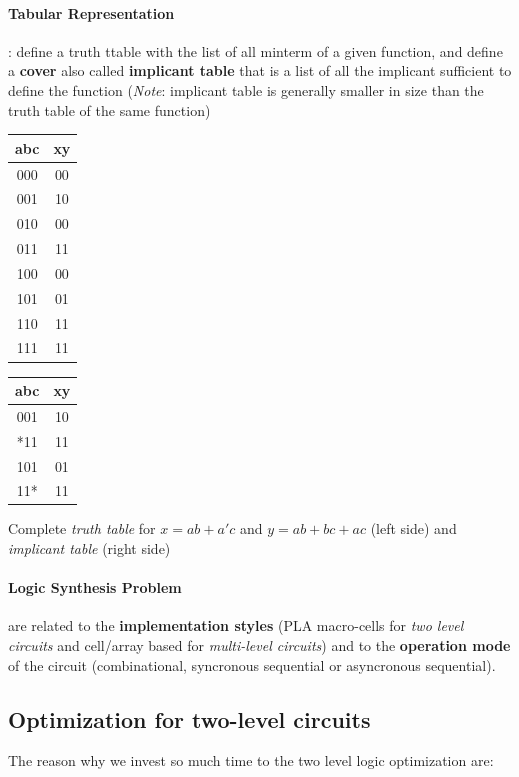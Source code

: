 \paragraph{Tabular Representation}: define a truth ttable with the list of all minterm of a given function, and define a \textbf{cover} also called \textbf{implicant table} that is a list of all the implicant sufficient to define the function (\textit{Note}: implicant table is generally smaller in size than the truth table of the same function)

\begin{center}
	
	\begin{tabular}{|c|c|}
		\hline
		abc & xy \\ \hline
		000 & 00 \\ \hline
		001 & 10 \\ \hline
		010 & 00 \\ \hline
		011 & 11 \\ \hline
		100 & 00 \\ \hline
		101 & 01 \\ \hline
		110 & 11 \\ \hline
		111 & 11 \\ \hline 
	\end{tabular}
	\quad
	\quad
	\quad
	\quad
	\quad
	\quad
	\quad
	\begin{tabular}{|c|c|}
		\hline
		abc & xy \\ \hline
		001 & 10 \\ \hline
		*11 & 11 \\ \hline
		101 & 01 \\ \hline
		11* & 11 \\ \hline 
	\end{tabular}
	
	\bigskip
	Complete \textit{truth table} for $ x= ab + a'c $ and $ y = ab + bc+ ac $ (left side) and \textit{implicant table} (right side)
\end{center}
\paragraph{Logic Synthesis Problem} are related to the \textbf{implementation styles} (PLA macro-cells for \textit{two level circuits} and cell/array based for \textit{multi-level circuits}) and to the \textbf{operation mode} of the circuit (combinational, syncronous sequential or asyncronous sequential).

\subsection{Optimization for two-level circuits}
The reason why we invest so much time to the two level logic optimization are:

